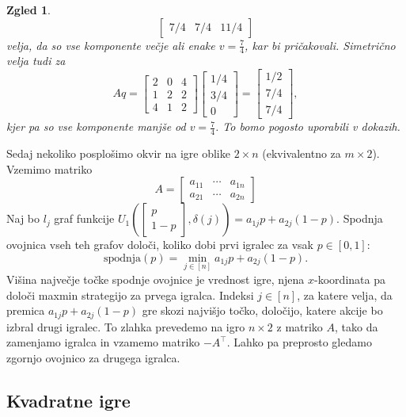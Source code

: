 \documentclass[10pt, a4paper]{article}
\newtheorem{zgled}[izr]{Zgled}
\begin{document}
\begin{zgled}
$$\begin{bmatrix}
    7/4 & 7/4 & 11/4
  \end{bmatrix}$$
  velja, da so vse komponente večje ali enake $v = \frac{7}{4}$, kar bi pričakovali.
  Simetrično velja tudi za 
  $$Aq = \begin{bmatrix}
    2 & 0 & 4\\
    1 & 2 & 2\\
    4 & 1 & 2
  \end{bmatrix} \begin{bmatrix}
    1/4 \\ 3/4 \\ 0
  \end{bmatrix} = \begin{bmatrix}
    1/2 \\ 7/4 \\ 7/4
  \end{bmatrix},$$
  kjer pa so vse komponente manjše od $v = \frac{7}{4}$.
  To bomo pogosto uporabili v dokazih.
\end{zgled}

Sedaj nekoliko posplošimo okvir na igre oblike $2 \times n$ (ekvivalentno za $m \times 2$).
Vzemimo matriko 
$$A = \begin{bmatrix}
  a_{11} & \cdots & a_{1n}\\
  a_{21} & \cdots & a_{2n}
\end{bmatrix}$$
Naj bo $l_j$ graf funkcije $U_1 \left( \begin{bmatrix}
  p \\ 1 - p
\end{bmatrix}, \delta(j) \right) = a_{1j} p + a_{2j} (1 - p)$.
Spodnja ovojnica vseh teh grafov določi, koliko dobi prvi igralec za vsak $p \in [0, 1]$:
$$\mathrm{spodnja} (p) = \min_{j \in [n]} a_{1j} p + a_{2j} (1 - p).$$
Višina največje točke spodnje ovojnice je vrednost igre, njena $x$-koordinata 
pa določi maxmin strategijo za prvega igralca. Indeksi $j \in [n]$,
za katere velja, da premica $a_{1j} p + a_{2j} (1 - p)$ gre skozi najvišjo točko, določijo,
katere akcije bo izbral drugi igralec. To zlahka prevedemo na igro $n \times 2$ z matriko $A$,
tako da zamenjamo igralca in vzamemo matriko $-A^\top$. Lahko pa preprosto gledamo zgornjo ovojnico za drugega igralca.

\subsection{Kvadratne igre}
\end{document}
